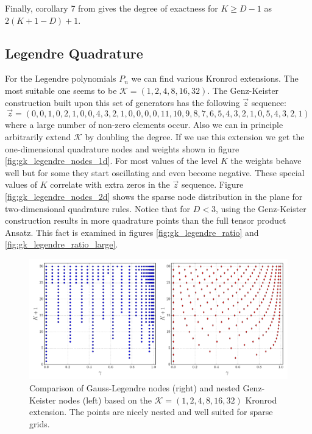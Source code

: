 \documentclass[a4paper,10pt]{article}
\begin{document}
Finally, corollary 7 from \cite{novak_ritter} gives the degree of exactness
for $K \geq D - 1$ as $2 (K+1-D) + 1$.


\subsection{Legendre Quadrature}

For the Legendre polynomials $P_n$ we can find various Kronrod extensions. The
most suitable one seems to be $\mathcal{K} = (1,2,4,8,16,32)$. The Genz-Keister
construction built upon this set of generators has the following $\vec{z}$
sequence:
\begin{equation*}
  \vec{z} = (0, 0, 1, 0, 2, 1, 0, 0, 4, 3, 2, 1, 0, 0, 0, 0, 11, 10, 9, 8, 7, 6, 5, 4, 3, 2, 1, 0, 5, 4, 3, 2, 1)
\end{equation*}
where a large number of non-zero elements occur. Also we can in principle
arbitrarily extend $\mathcal{K}$ by doubling the degree. If we use this
extension we get the one-dimensional quadrature nodes and weights shown
in figure \ref{fig:gk_legendre_nodes_1d}. For most values of the level $K$
the weights behave well but for some they start oscillating and even become
negative. These special values of $K$ correlate with extra zeros in the
$\vec{z}$ sequence. Figure \ref{fig:gk_legendre_nodes_2d} shows the sparse
node distribution in the plane for two-dimensional quadrature rules.
Notice that for $D < 3$, using the Genz-Keister construction results
in more quadrature points than the full tensor product Ansatz. This
fact is examined in figures \ref{fig:gk_legendre_ratio} and \ref{fig:gk_legendre_ratio_large}.

\begin{figure}[h]
  \centering
  \includegraphics[width=\linewidth]{./img/gk_legendre_nodes_cmp.pdf}
  \caption{Comparison of Gauss-Legendre nodes (right) and nested Genz-Keister nodes (left)
  based on the $\mathcal{K} = (1,2,4,8,16,32)$ Kronrod extension. The points are
  nicely nested and well suited for sparse grids.}
  \label{fig:gk_legendre_nodes_cmp}
\end{figure}
\end{document}
